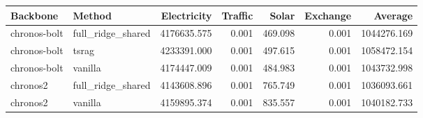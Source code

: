 \begin{tabular}{llrrrrr}
\toprule
Backbone & Method & Electricity & Traffic & Solar & Exchange & Average \\
\midrule
chronos-bolt & full\_ridge\_shared & 4176635.575 & 0.001 & 469.098 & 0.001 & 1044276.169 \\
chronos-bolt & tsrag & 4233391.000 & 0.001 & 497.615 & 0.001 & 1058472.154 \\
chronos-bolt & vanilla & 4174447.009 & 0.001 & 484.983 & 0.001 & 1043732.998 \\
chronos2 & full\_ridge\_shared & 4143608.896 & 0.001 & 765.749 & 0.001 & 1036093.661 \\
chronos2 & vanilla & 4159895.374 & 0.001 & 835.557 & 0.001 & 1040182.733 \\
\bottomrule
\end{tabular}

